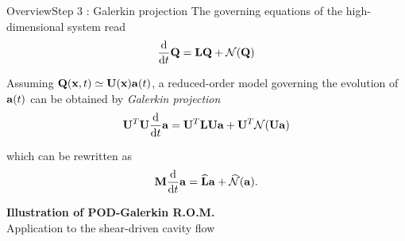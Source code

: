 \documentclass[usenames,dvipsnames,svgnames,10pt,aspectratio=169]{beamer}
\begin{document}
\begin{frame}[t, c]{Overview}{Step 3 : Galerkin projection}
	The governing equations of the high-dimensional system read
	\begin{equation}
		\displaystyle \frac{\mathrm{d}}{\mathrm{d}t} {\bf Q} = {\bf LQ} + \mathcal{N}({\bf Q})
		\notag
	\end{equation}

	Assuming ${\bf Q}({\bf x}, t) \simeq {\bf U}({\bf x}){\bf a}(t)$, a reduced-order model governing the evolution of ${\bf a}(t)$ can be obtained by \emph{Galerkin projection}
	\begin{equation}
		\displaystyle {\bf U}^T{\bf U}\frac{\mathrm{d}}{\mathrm{d}t}{\bf a} = {\bf U}^T {\bf LUa} + {\bf U}^T \mathcal{N}({\bf Ua})
		\notag
	\end{equation}

	which can be rewritten as
	\begin{equation}
		\displaystyle {\bf M}\frac{\mathrm{d}}{\mathrm{d}t}{\bf a} =  \widehat{\bf L}{\bf a} + \widehat{\mathcal{N}}({\bf a}).
		\notag
	\end{equation}
\end{frame}


\begin{frame}[t, c]
	\centering
	\vspace{1cm}
	{\Large \textbf{Illustration of POD-Galerkin R.O.M.}}	 \\
	\medskip
	{\large Application to the shear-driven cavity flow}
\end{frame}
\end{document}
